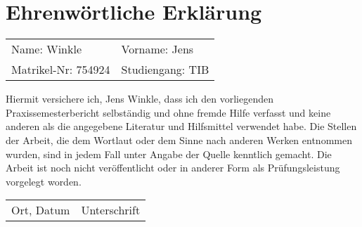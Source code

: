 \chapter*{Ehrenwörtliche Erklärung}

\begin{center}
\begin{tabular}{ p{} p{} }
Name: Winkle & Vorname: Jens \\
Matrikel-Nr: 754924 & Studiengang: TIB \\
\end{tabular}
\end{center}

Hiermit versichere ich, Jens Winkle, dass ich den vorliegenden Praxissemesterbericht selbständig und ohne fremde Hilfe verfasst und keine anderen als die angegebene Literatur und Hilfsmittel verwendet habe. Die Stellen der Arbeit, die dem Wortlaut oder dem Sinne nach anderen Werken ent­nommen wurden, sind in jedem Fall unter Angabe der Quelle kenntlich gemacht. Die Arbeit ist noch nicht veröffentlicht oder in anderer Form als Prüfungsleistung vorgelegt worden.

\vspace{\baselineskip}
\begin{center}
\begin{tabular}{ p{} p{} }
\hline
Ort, Datum & Unterschrift \\
\end{tabular}
\end{center}
